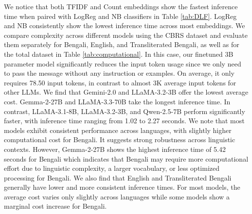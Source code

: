 \documentclass[11pt]{article}
\begin{document}
We notice that both TFIDF and Count embeddings show the fastest inference time when paired with LogReg and NB classifiers in Table \ref{tab:DLF}. LogReg and NB consistently show the lowest inference time across most embeddings. We compare complexity across different models using the CBRS dataset and evaluate them separately for Bengali, English, and Transliterated Bengali, as well as for the total dataset in Table \ref{tab:computational}. In this case, our finetuned 3B parameter model significantly reduces the input token usage since we only need to pass the message without any instruction or examples. On average, it only requires 78.50 input tokens, in contrast to almost 3K average input tokens for other LLMs. We find that Gemini-2.0 and LLaMA-3.2-3B offer the lowest average cost. Gemma-2-27B and LLaMA-3.3-70B take the longest inference time. In contrast, LLaMA-3.1-8B, LLaMA-3.2-3B, and Qwen-2.5-7B perform significantly faster, with inference time ranging from 1.02 to 2.27 seconds. We note that most models exhibit consistent performance across languages, with slightly higher computational cost for Bengali. It suggests strong robustness across linguistic contexts. However, Gemma-2-27B shows the highest inference time of 5.42 seconds for Bengali which indicates that Bengali may require more computational effort due to linguistic complexity, a larger vocabulary, or less optimized processing for Bengali. We also find that English and Transliterated Bengali generally have lower and more consistent inference times. For most models, the average cost varies only slightly across languages while some models show a marginal cost increase for Bengali. 
\end{document}
